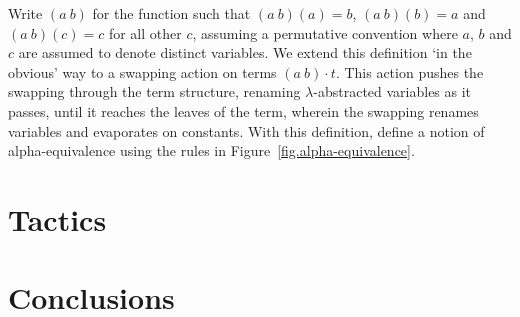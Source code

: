 \documentclass{llncs}
\begin{document}
Write $(a\ b)$ for the function such that $(a\ b)(a) = b$, $(a\ b)(b) = a$ and $(a\ b)(c) = c$ for all other $c$, assuming a permutative convention where $a$, $b$ and $c$ are assumed to denote distinct variables.
We extend this definition `in the obvious' way to a swapping action on terms $(a\ b) \cdot t$.
This action pushes the swapping through the term structure, renaming $\lambda$-abstracted variables as it passes, until it reaches the leaves of the term, wherein the swapping renames variables and evaporates on constants.
With this definition, define a notion of alpha-equivalence using the rules in Figure~\ref{fig.alpha-equivalence}.


\section{Tactics}
\label{sect.tactics}

\section{Conclusions}
\label{sect.conclusions}


\end{document}

